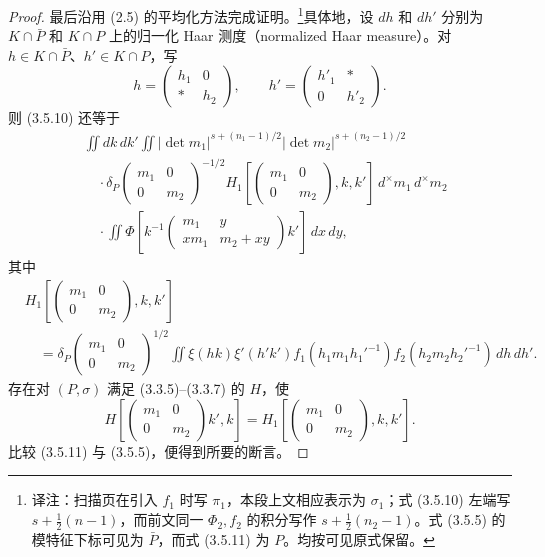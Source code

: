 \begin{proof}
最后沿用 (2.5) 的平均化方法完成证明。\footnote{译注：扫描页在引入 $f_1$ 时写 $\pi_1$，本段上文相应表示为 $\sigma_1$；式 (3.5.10) 左端写 $s+\tfrac12(n-1)$，而前文同一 $\Phi_2,f_2$ 的积分写作 $s+\tfrac12(n_2-1)$。式 (3.5.5) 的模特征下标可见为 $\bar P$，而式 (3.5.11) 为 $P$。均按可见原式保留。}具体地，设 $dh$ 和 $dh'$ 分别为 $K\cap\bar P$ 和 $K\cap P$ 上的归一化 Haar 测度（normalized Haar measure）。对 $h\in K\cap\bar P$、$h'\in K\cap P$，写
\[
h=\begin{pmatrix}h_1&0\\ *&h_2\end{pmatrix},\qquad
h'=\begin{pmatrix}h'_1&*\\0&h'_2\end{pmatrix}.
\]
则 (3.5.10) 还等于
\begin{equation}
\begin{aligned}
&\iint dk\,dk'\iint|\det m_1|^{s+(n_1-1)/2}|\det m_2|^{s+(n_2-1)/2}\\
&\quad\cdot\delta_P\!\begin{pmatrix}m_1&0\\0&m_2\end{pmatrix}^{-1/2}
H_1\!\left[\begin{pmatrix}m_1&0\\0&m_2\end{pmatrix},k,k'\right]
\,d^\times m_1\,d^\times m_2\\
&\quad\cdot\iint\Phi\!\left[k^{-1}\begin{pmatrix}m_1&y\\xm_1&m_2+xy\end{pmatrix}k'\right]\,dx\,dy,
\end{aligned}\tag{3.5.11}
\end{equation}
其中
\begin{equation}
\begin{aligned}
&H_1\!\left[\begin{pmatrix}m_1&0\\0&m_2\end{pmatrix},k,k'\right]\\
&\quad=\delta_P\!\begin{pmatrix}m_1&0\\0&m_2\end{pmatrix}^{1/2}
\iint\xi(hk)\xi'(h'k')f_1(h_1m_1h_1'^{-1})f_2(h_2m_2h_2'^{-1})\,dh\,dh'.
\end{aligned}\tag{3.5.12}
\end{equation}
存在对 $(P,\sigma)$ 满足 (3.3.5)--(3.3.7) 的 $H$，使
\begin{equation}
H\!\left[\begin{pmatrix}m_1&0\\0&m_2\end{pmatrix}k',k\right]
=H_1\!\left[\begin{pmatrix}m_1&0\\0&m_2\end{pmatrix},k,k'\right].\tag{3.5.13}
\end{equation}
比较 (3.5.11) 与 (3.5.5)，便得到所要的断言。
\end{proof}

